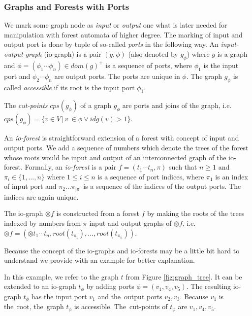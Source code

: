 \documentclass[a4paper, 12pt]{article}
\begin{document}
\subsubsection{Graphs and Forests with Ports}
\label{subsec:gfp}

We mark some graph node as \emph{input} or \emph{output} one what is later needed for manipulation
with forest automata of higher degree.
The marking of input and output port is done by tuple of so-called \emph{ports} in the following way.
An \emph{input-output-graph} (io-graph) is a pair $(g,\phi)$ (also denoted by $g_\phi$)
where $g$ is a graph and $\phi=(\phi_1 \cdots \phi_n) \in dom(g)^+$ is a sequence of ports,
where $\phi_1$ is the input port and $\phi_2 \cdots \phi_n$ are output ports.
The ports are unique in $\phi$.
The graph $g_\phi$ is called \emph{accessible} if its root is the input port $\phi_1$.

The \emph{cut-points} $cps(g_\phi)$ of a graph $g_\phi$ are ports and joins of the graph,
i.e. $cps(g_\phi)=\{v \in V\,|\, v~\in \phi \vee idg(v) > 1\}$.

An \emph{io-forest} is straightforward extension of a forest with concept of input and output ports.
We add a sequence of numbers which denote the trees of the forest whose roots would
be input and output of an interconnected graph of the io-forest.
Formally, an \emph{io-forest} is a pair $f=(t_1 \cdots t_n, \pi)$ such that $n \geq 1$ and $\pi_i \in \{1,\ldots,n\}$ where $1 \leq i \leq n$
is a sequence of port indices, where $\pi_1$ is an index of input port and $\pi_2 \ldots \pi_{|\pi|}$ is a sequence of
the indices of the output ports.
The indices are again unique.

The io-graph $\otimes f$ is constructed from a forest $f$ by making
the roots of the trees indexed by numbers from $\pi$ input and output graphs
of $\otimes f$, i.e. $\otimes f = (\otimes t_1 \cdots t_n,root(t_{\pi_{1}}),\ldots,root(t_{\pi_{n}}))$.

Because the concept of the io-graphs and io-forests may be a little bit
hard to understand we provide with an example for better explanation.

\bexmp
In this example, we refer to the graph $t$ from Figure \ref{fig:graph_tree}.
It can be extended to an io-graph $t_\phi$ by adding ports $\phi=(v_1,v_4,v_5)$.
The resulting io-graph $t_\phi$ has the input port $v_1$ and the~output ports $v_2,v_3$.
Because $v_1$ is the~root, the~graph $t_\phi$ is accessible.
The~cut-points of $t_\phi$ are $v_1, v_4, v_5$.
\end{document}
